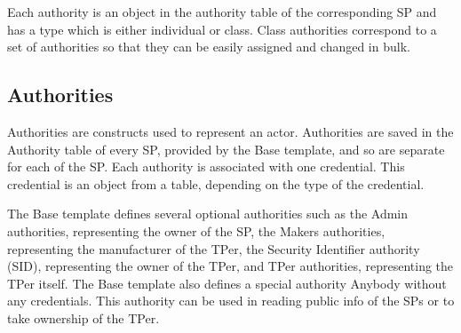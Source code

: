Each authority is an object in the authority table of the corresponding SP and has a type which is either individual or class. Class authorities correspond to a set of authorities so that they can be easily assigned and changed in bulk.



\subsection{Authorities}
\label{subsection:authorities}

Authorities are constructs used to represent an actor. Authorities are saved in the Authority table of every SP, provided by the Base template, and so are separate for each of the SP. Each authority is associated with one credential. This credential is an object from a table, depending on the type of the credential.

The Base template defines several optional authorities such as the Admin authorities, representing the owner of the SP, the Makers authorities, representing the manufacturer of the TPer, the Security Identifier authority (SID), representing the owner of the TPer, and TPer authorities, representing the TPer itself.
The Base template also defines a special authority Anybody without any credentials. This authority can be used in reading public info of the SPs or to take ownership of the TPer.


